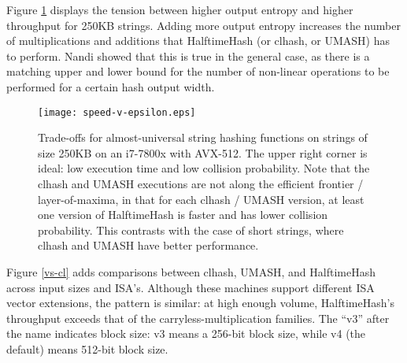 \documentclass[runningheads]{llncs}
\begin{document}
Figure \ref{frontier} displays the tension between higher output entropy and higher throughput for 250KB strings.
Adding more output entropy increases the number of multiplications and additions that HalftimeHash (or clhash, or UMASH) has to perform.
Nandi showed that this is true in the general case, as there is a matching upper and lower bound for the number of non-linear operations to be performed for a certain hash output width. \cite{ehc-nandi}




\begin{figure}
\texttt{[image: speed-v-epsilon.eps]}
\caption{
  \label{frontier}
  Trade-offs for almost-universal string hashing functions on strings of size 250KB on an i7-7800x with AVX-512.
  The upper right corner is ideal: low execution time and low collision probability.
  Note that the clhash and UMASH executions are not along the efficient frontier / layer-of-maxima, in that for each clhash / UMASH version, at least one version of HalftimeHash is faster and has lower collision probability. \protect\cite{layer-of-maxima}
  This contrasts with the case of short strings, where clhash and UMASH have better performance.
}
\end{figure}

Figure \ref{vs-cl} adds comparisons between clhash, UMASH, and HalftimeHash across input sizes and ISA's.
Although these machines support different ISA vector extensions, the pattern is similar: at high enough volume, HalftimeHash's throughput exceeds that of the carryless-multiplication families.
The ``v3'' after the name indicates block size: v3 means a 256-bit block size, while v4 (the default) means 512-bit block size.

\end{document}
